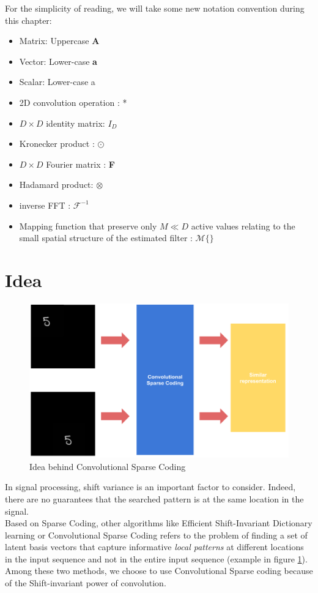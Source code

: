 For the simplicity of reading, we will take some new notation convention during this chapter:\\
\begin{itemize}
 \item Matrix: Uppercase  \textbf{A}
 \item Vector: Lower-case  \textbf{a}
 \item Scalar: Lower-case a
 \item 2D convolution operation : *
 \item $D \times D$ identity matrix: \textbf{$I_D$}
 \item Kronecker product : $\odot$
 \item $D \times D$ Fourier matrix : \textbf{F}
 \item Hadamard product: $\otimes$
 \item inverse FFT : $ \mathcal{F}^{-1}$
 \item Mapping function that preserve only $M \ll D$ active values relating to the small spatial structure of the estimated filter : $ \mathcal{M}\{\}$
\end{itemize} 


\section{Idea}
\begin{figure}[h]
 \centering
 \includegraphics[scale=0.3]{csc_idea.png}
 \caption{Idea behind Convolutional Sparse Coding}
 \label{fig:csc_idea}
\end{figure}
In signal processing, shift variance is an important factor to consider. Indeed, there are no guarantees that the searched pattern is at the same location in the signal.\\
Based on Sparse Coding, other algorithms like Efficient Shift-Invariant Dictionary learning \cite{Zheng:2016:ESD:2939672.2939824} or Convolutional Sparse Coding \cite{6618901} refers to the problem of finding a set of latent basis vectors that capture informative \textit{local patterns} at different locations in the input sequence and not in the entire input sequence (example in figure \ref{fig:csc_idea}).\\
Among these two methods, we choose to use Convolutional Sparse coding because of the Shift-invariant power of convolution.


